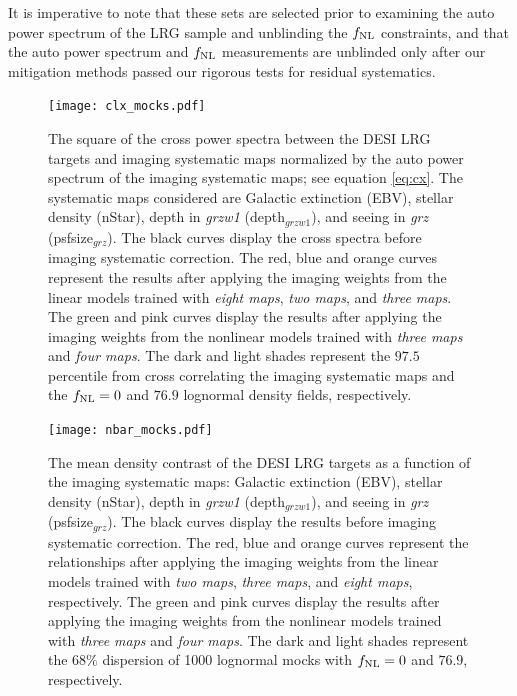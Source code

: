 It is imperative to note that these sets are selected prior to examining the auto power spectrum of the LRG sample and unblinding the $f_{\rm NL}$ constraints, and that the auto power spectrum and $f_{\rm NL}$ measurements are unblinded only after our mitigation methods passed our rigorous tests for residual systematics. 



\begin{figure}
\centering
\texttt{[image: clx\_mocks.pdf]}
\caption{The square of the cross power spectra between the DESI LRG targets and imaging systematic maps normalized by the auto power spectrum of the imaging systematic maps; see equation \ref{eq:cx}. The systematic maps considered are Galactic extinction (EBV), stellar density (nStar), depth in \textit{grzw1} (depth$_{grzw1}$), and seeing in \textit{grz} (psfsize$_{grz}$). The black curves display the cross spectra before imaging systematic correction. The red, blue and orange curves represent the results after applying the imaging weights from the linear models trained with \textit{eight maps}, \textit{two maps}, and \textit{three maps}. The green and pink curves display the results after applying the imaging weights from the nonlinear models trained with \textit{three maps} and \textit{four maps}. The dark and light shades represent the $97.5$ percentile from cross correlating the imaging systematic maps and the $f_{\rm NL}=0$ and $76.9$ lognormal density fields, respectively.}\label{fig:clxmock}
\end{figure}

\begin{figure}
\centering
\texttt{[image: nbar\_mocks.pdf]}
\caption{The mean density contrast of the DESI LRG targets as a function of the imaging systematic maps: Galactic extinction (EBV), stellar density (nStar), depth in \textit{grzw1} (depth$_{grzw1}$), and seeing in \textit{grz} (psfsize$_{grz}$). The black curves display the results before imaging systematic correction. The red, blue and orange curves represent the relationships after applying the imaging weights from the linear models trained with \textit{two maps}, \textit{three maps}, and \textit{eight maps}, respectively. The green and pink curves display the results after applying the imaging weights from the nonlinear models trained with \textit{three maps} and \textit{four maps}. The dark and light shades represent the $68\%$ dispersion of 1000 lognormal mocks with $f_{\rm NL}=0$ and $76.9$, respectively.}\label{fig:nbarmock}
\end{figure}


